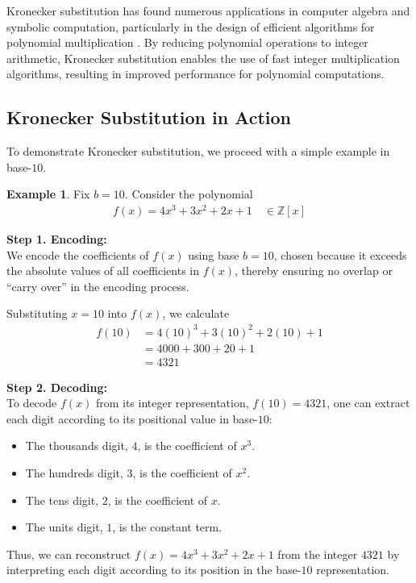 \documentclass[11pt,reqno]{article}
\theoremstyle{plain}
\theoremstyle{definition}
\newtheorem{example}{Example}
\begin{document}
Kronecker substitution has found numerous applications in computer algebra and symbolic computation, particularly in the design of efficient algorithms for polynomial multiplication \cite{harvey2009kronecker, harvey2014faster}. By reducing polynomial operations to integer arithmetic, Kronecker substitution enables the use of fast integer multiplication algorithms, resulting in improved performance for polynomial computations.

\subsection{Kronecker Substitution in Action}
To demonstrate Kronecker substitution, we proceed with a simple example in base-$10$.

\begin{example}
Fix $b=10$. Consider the polynomial 
\begin{align*}
    f(x) = 4x^3 + 3x^2 + 2x + 1 \quad \in \mathbb{Z}[x]
\end{align*}

\textbf{Step 1. Encoding:} \\
We encode the coefficients of $f(x)$ using base $b=10$, chosen because it exceeds the absolute values of all coefficients in $f(x)$, thereby ensuring no overlap or ``carry over'' in the encoding process.

Substituting $x = 10$ into $f(x)$, we calculate
\begin{align*}
    f(10) &= 4(10)^3 + 3(10)^2 + 2(10) + 1 \\
    &= 4000 + 300 + 20 + 1 \\
    &= 4321
\end{align*}

\textbf{Step 2. Decoding:} \\
To decode $f(x)$ from its integer representation, $f(10) = 4321$, one can extract each digit according to its positional value in base-$10$:
\begin{itemize}
    \item The thousands digit, $4$, is the coefficient of $x^3$.
    \item The hundreds digit, $3$, is the coefficient of $x^2$.
    \item The tens digit, $2$, is the coefficient of $x$.
    \item The units digit, $1$, is the constant term.
\end{itemize}

Thus, we can reconstruct $f(x) = 4x^3 + 3x^2 + 2x + 1$ from the integer $4321$ by interpreting each digit according to its position in the base-$10$ representation.
\end{example}
\end{document}
